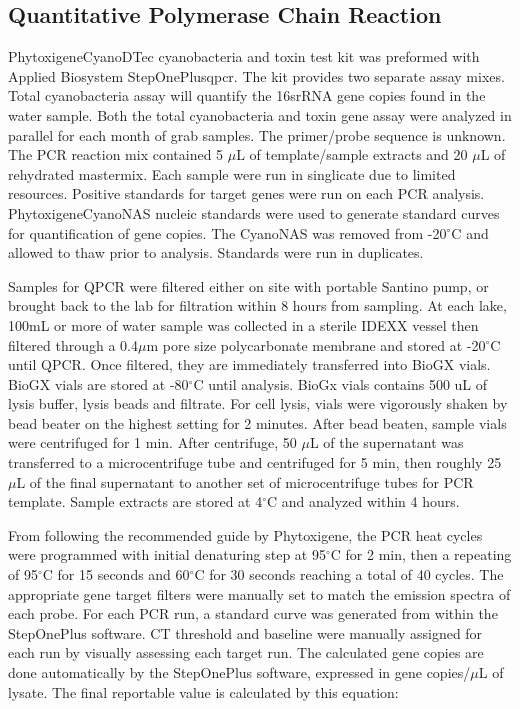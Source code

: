 \subsection{Quantitative Polymerase Chain Reaction}

Phytoxigene\texttrademark  CyanoDTec cyanobacteria and toxin test kit was preformed with Applied Biosystem StepOnePlus\texttrademark \gls{qpcr}. The kit provides two separate assay mixes. Total cyanobacteria assay will quantify the 16srRNA gene copies found in the water sample. Both the total cyanobacteria and toxin gene assay  were analyzed in parallel for each month of grab samples. The primer/probe sequence is unknown.  The PCR reaction mix contained 5 $\mu$L of template/sample extracts and 20 $\mu$L of rehydrated mastermix.  Each sample were run in singlicate due to limited resources. Positive standards for target genes  were run on each PCR analysis. Phytoxigene\texttrademark  CyanoNAS nucleic standards were used to generate standard curves for quantification of gene copies. The CyanoNAS was removed from -20$^\circ$C and allowed to thaw prior to analysis.  Standards were run in duplicates.

Samples for QPCR were filtered either on site with portable Santino pump, or brought back to the lab for filtration within 8 hours from sampling.
At each lake, 100mL or more of water sample was collected in a sterile IDEXX vessel then filtered through a 0.4$\mu$m pore size polycarbonate membrane  and stored at -20$^\circ$C until QPCR. Once filtered, they are immediately transferred into BioGX vials. BioGX vials are stored at -80$^\circ$C until analysis. BioGx vials contains 500 uL of lysis buffer, lysis beads and filtrate. For cell lysis, vials were vigorously shaken by bead beater on the highest setting for 2 minutes. After bead beaten, sample vials were centrifuged for 1 min. After centrifuge, 50 $\mu$L of the supernatant was transferred to a microcentrifuge tube and centrifuged for 5 min, then roughly 25 $\mu$L of the final supernatant to another set of microcentrifuge tubes for PCR template.  Sample extracts are stored at 4$^\circ$C and analyzed within 4 hours.

From following the recommended guide by Phytoxigene, the PCR heat cycles were programmed with initial denaturing step at 95$^\circ$C for 2 min, then a repeating of 95$^\circ$C for 15 seconds and 60$^\circ$C for 30 seconds reaching a total of 40 cycles. The appropriate gene target filters were manually set to match the emission spectra of each probe.  For each PCR run, a standard curve was generated  from within the StepOnePlus software. CT threshold and baseline were manually assigned for each run by visually assessing each target run. The calculated gene copies are done automatically by the StepOnePlus software, expressed in gene copies/$\mu$L of lysate. The final reportable value is calculated by this equation:

